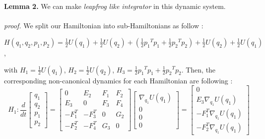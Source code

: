 \documentclass{article}
\begin{document}
\\
\\
\noindent \textbf{Lemma 2.}  We can make \textit{leapfrog like integrator} in this dynamic system.
\\
\\
\textit{proof.} We split our Hamiltonian into sub-Hamiltonians as follow :
\begin{center}
$\displaystyle H(q_1, q_2, p_1, p_2) = \frac{1}{2}U(q_1) + \frac{1}{2}U(q_2)+(\frac{1}{2}{p_1}^T p_1 + \frac{1}{2}{p_2}^T p_2 )+ \frac{1}{2}U(q_2) + \frac{1}{2}U(q_1) $, 
\end{center}
with $\displaystyle H_1 = \frac{1}{2}U(q_1)$, $\displaystyle H_2 = \frac{1}{2}U(q_2)$, $\displaystyle H_3 = \frac{1}{2}{p_1}^T p_1 + \frac{1}{2}{p_2}^T p_2 $. Then, the corresponding non-canonical dynamics for each Hamiltonian are following :
\[
H_1 : \frac{d}{dt}
\left[
\begin{array}{ccc}
q_1 \\
q_2 \\
p_1 \\
p_2 
\end{array}
\right]
=
\left[
\begin{array}{cclcc}
0 & E_{2} & F_{1} & F_{2} \\
E_3 & 0& F_3 & F_4 \\
-F_1^T & -F_3^T & 0 & G_2 \\
-F_2^T & -F_4^T & G_3 & 0 
\end{array}
\right]
\left[
\begin{array}{ccc}
\nabla_{q_1} U(q_1) \\
0 \\
0 \\
0 
\end{array}
\right]
=
\left[
\begin{array}{ccc}
0 \\
E_3 \nabla_{q_1} U(q_1) \\
-F_1^T \nabla_{q_1} U(q_1) \\
-F_2^T \nabla_{q_1} U(q_1) 
\end{array}
\right]
\] 
\end{document}
